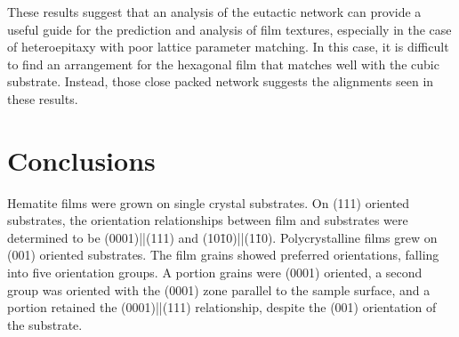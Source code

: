These results suggest that an analysis of the eutactic network can provide a useful guide
for the prediction and analysis of film textures, especially in the case of heteroepitaxy
with poor lattice parameter matching. In this case, it is difficult to find an
arrangement for the hexagonal film that matches well with the cubic substrate. Instead, those
close packed network suggests the alignments seen in these results.


\section{Conclusions}
\label{sec:single.growth.conclusions}


Hematite  films were grown on single crystal  substrates. On (111)
oriented substrates, the orientation relationships between film and substrates were
determined to be (0001)||(111) and
(10\={1}0)||(1\={1}0). Polycrystalline films grew on (001) oriented
substrates. The film grains showed preferred orientations, falling into five orientation
groups. A portion grains were (0001) oriented, a second group was oriented with the (0001)
zone parallel to the sample surface, and a portion retained the
(0001)||(111) relationship, despite the (001) orientation of the
substrate.